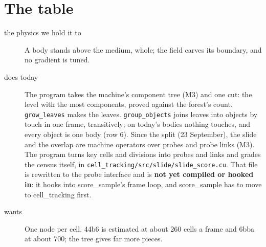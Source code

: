 \section{\texorpdfstring{The table}{The table}}

\begin{description}
\item[{the physics we hold it to}] A body stands above the medium, whole; the field carves its boundary, and no gradient is tuned.
\item[{does today}] The program takes the machine's component tree (M3) and one cut: the level with the most components, proved against the forest's count. \texttt{grow\_\allowbreak{}leaves} makes the leaves. \texttt{group\_\allowbreak{}objects} joins leaves into objects by touch in one frame, transitively; on today's bodies nothing touches, and every object is one body (row 6). Since the split (23 September), the slide and the overlap are machine operators over probes and probe links (M3). The program turns key cells and divisions into probes and links and grades the census itself, in \texttt{cell\_\allowbreak{}tracking/\allowbreak{}src/\allowbreak{}slide/\allowbreak{}slide\_\allowbreak{}score.\allowbreak{}cu}. That file is rewritten to the probe interface and is \textbf{not yet compiled or hooked in}: it hooks into score\_\allowbreak{}sample's frame loop, and score\_\allowbreak{}sample has to move to cell\_\allowbreak{}tracking first.
\item[{wants}] One node per cell. 44b6 is estimated at about 260 cells a frame and 6bba at about 700; the tree gives far more pieces.

\end{description}
